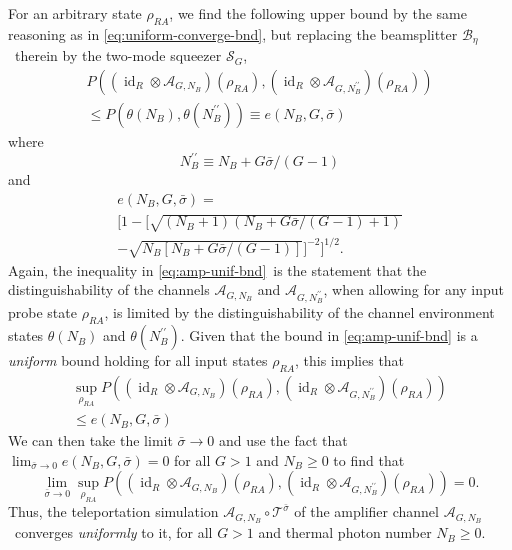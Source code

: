 \documentclass[apsrev,twocolumn]{revtex4-1}%
\begin{document}
For an arbitrary state $\rho_{RA}$, we find the following upper bound by the
same reasoning as in \eqref{eq:uniform-converge-bnd}, but replacing the
beamsplitter $\mathcal{B}_{\eta}$\ therein by the two-mode squeezer
$\mathcal{S}_{G}$,%
\begin{multline}
P((\operatorname{id}_{R}\otimes\mathcal{A}_{G,N_{B}})(\rho_{RA}%
),(\operatorname{id}_{R}\otimes\mathcal{A}_{G,N_{B}^{\prime\prime}})(\rho
_{RA}))\label{eq:amp-unif-bnd}\\
\leq P(\theta(N_{B}),\theta(N_{B}^{\prime\prime}))\equiv e(N_{B},G,\bar
{\sigma})
\end{multline}
where%
\begin{equation}
N_{B}^{\prime\prime}\equiv N_{B}+G\bar{\sigma}/(G-1)
\end{equation}
and%
\begin{multline}
e(N_{B},G,\bar{\sigma})=\\
\Bigg[1-\Big[\sqrt{\left(  N_{B}+1\right)  \left(  N_{B}+G\bar{\sigma
}/(G-1)+1\right)  }\\
-\sqrt{N_{B}\left[  N_{B}+G\bar{\sigma}/(G-1)\right]  }\Big]^{-2}\Bigg]^{1/2}.
\end{multline}
Again, the inequality in \eqref{eq:amp-unif-bnd}\ is the statement that the
distinguishability of the channels $\mathcal{A}_{G,N_{B}}$ and $\mathcal{A}%
_{G,N_{B}^{\prime\prime}}$, when allowing for any input probe state $\rho
_{RA}$, is limited by the distinguishability of the channel environment states
$\theta(N_{B})$ and $\theta(N_{B}^{\prime\prime})$. Given that the bound in
\eqref{eq:amp-unif-bnd} is a \textit{uniform} bound holding for all input
states $\rho_{RA}$, this implies that%
\begin{multline}
\sup_{\rho_{RA}}P((\operatorname{id}_{R}\otimes\mathcal{A}_{G,N_{B}}%
)(\rho_{RA}),(\operatorname{id}_{R}\otimes\mathcal{A}_{G,N_{B}^{\prime\prime}%
})(\rho_{RA}))\\
\leq e(N_{B},G,\bar{\sigma}) \label{eq:amp-unif-bnd-final}%
\end{multline}
We can then take the limit $\bar{\sigma}\rightarrow0$ and use the fact that
$\lim_{\bar{\sigma}\rightarrow0}e(N_{B},G,\bar{\sigma})=0$ for all $G>1$ and
$N_{B}\geq0$ to find that%
\begin{equation}
\lim_{\bar{\sigma}\rightarrow0}\sup_{\rho_{RA}}P((\operatorname{id}_{R}%
\otimes\mathcal{A}_{G,N_{B}})(\rho_{RA}),(\operatorname{id}_{R}\otimes
\mathcal{A}_{G,N_{B}^{\prime\prime}})(\rho_{RA}))=0.
\end{equation}
Thus, the teleportation simulation $\mathcal{A}_{G,N_{B}}\circ\mathcal{T}%
^{\bar{\sigma}}$ of the amplifier channel $\mathcal{A}_{G,N_{B}}$\ converges
\textit{uniformly} to it, for all $G>1$ and thermal photon number $N_{B}\geq0$.
\end{document}
